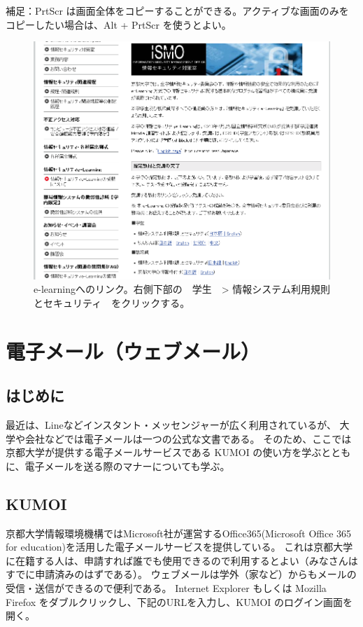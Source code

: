 補足：PrtScr は画面全体をコピーすることができる。アクティブな画面のみをコピーしたい場合は、Alt + PrtScr を使うとよい。

\begin{figure}
\centering
\includegraphics[width=13cm]{TeX_files/figs2/e-learning.png}
\caption{
\label{fig:e-learning}
e-learningへのリンク。右側下部の　学生　> 情報システム利用規則とセキュリティ　をクリックする。
}

\end{figure}
\section{電子メール（ウェブメール）}
\subsection{はじめに}
最近は、Lineなどインスタント・メッセンジャーが広く利用されているが、
大学や会社などでは電子メールは一つの公式な文書である。
そのため、ここでは京都大学が提供する電子メールサービスである KUMOI の使い方を学ぶとともに、電子メールを送る際のマナーについても学ぶ。

\subsection{KUMOI}
京都大学情報環境機構ではMicrosoft社が運営するOffice365(Microsoft Office 365 for education)を活用した電子メールサービスを提供している。
これは京都大学に在籍する人は、申請すれば誰でも使用できるので利用するとよい（みなさんはすでに申請済みのはずである）。
ウェブメールは学外（家など）からもメールの受信・送信ができるので便利である。
Internet Explorer もしくは Mozilla Firefox をダブルクリックし、下記のURLを入力し、KUMOI のログイン画面を開く。 

